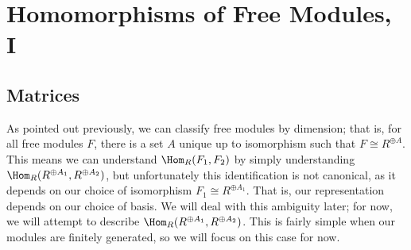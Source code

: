 \section{Homomorphisms of Free Modules, I}
\subsection{Matrices}
As pointed out previously, we can classify free modules by dimension; that is, for all free modules $F$, there is a set $A$ unique up to isomorphism such that $F\cong R^{\oplus A} $. This means we can understand $\Hom_{R}(F_1, F_2) $ by simply understanding $\Hom_{R}(R^{\oplus A_1} , R^{\oplus A_2} ) $, but unfortunately this identification is not canonical, as it depends on our choice of isomorphism $F_1\cong R^{\oplus A_1} $. That is, our representation depends on our choice of basis. We will deal with this ambiguity later; for now, we will attempt to describe $\Hom_{R}(R^{\oplus A_1} , R^{\oplus A_2} ) $. This is fairly simple when our modules are finitely generated, so we will focus on this case for now.


